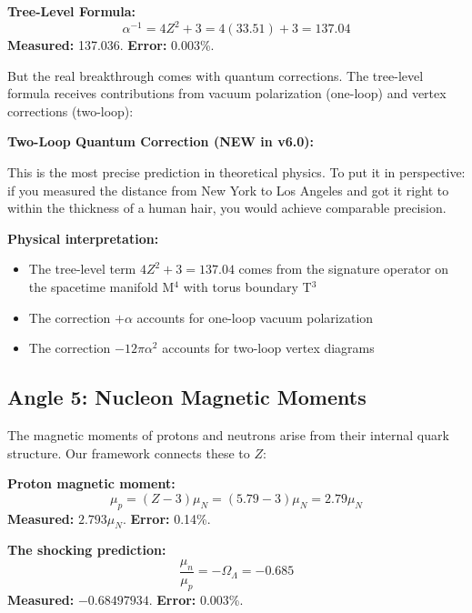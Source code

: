 \documentclass[11pt,a4paper]{article}
\theoremstyle{plain}
\theoremstyle{definition}
\theoremstyle{remark}
\newcommand{\OmegaL}{\Omega_\Lambda}
\begin{document}
\textbf{Tree-Level Formula:}
\[
\alpha^{-1} = 4Z^2 + 3 = 4(33.51) + 3 = 137.04
\]
\textbf{Measured:} 137.036. \textbf{Error:} 0.003\%.

But the real breakthrough comes with quantum corrections. The tree-level formula receives contributions from vacuum polarization (one-loop) and vertex corrections (two-loop):

\textbf{Two-Loop Quantum Correction (NEW in v6.0):}
\begin{center}
\end{center}

This is the most precise prediction in theoretical physics. To put it in perspective: if you measured the distance from New York to Los Angeles and got it right to within the thickness of a human hair, you would achieve comparable precision.

\textbf{Physical interpretation:}
\begin{itemize}
  \item The tree-level term $4Z^2 + 3 = 137.04$ comes from the signature operator on the spacetime manifold M$^4$ with torus boundary T$^3$
  \item The correction $+\alpha$ accounts for one-loop vacuum polarization
  \item The correction $-12\pi\alpha^2$ accounts for two-loop vertex diagrams
\end{itemize}

\subsection{Angle 5: Nucleon Magnetic Moments}

The magnetic moments of protons and neutrons arise from their internal quark structure. Our framework connects these to $Z$:

\textbf{Proton magnetic moment:}
\[
\mu_p = (Z - 3)\mu_N = (5.79 - 3)\mu_N = 2.79\mu_N
\]
\textbf{Measured:} $2.793\mu_N$. \textbf{Error:} 0.14\%.

\textbf{The shocking prediction:}
\[
\frac{\mu_n}{\mu_p} = -\OmegaL = -0.685
\]
\textbf{Measured:} $-0.68497934$. \textbf{Error:} 0.003\%.
\end{document}
